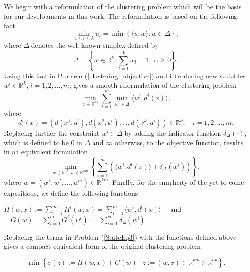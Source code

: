 We begin with a reformulation of the clustering problem which will be the basis for our developments in this work. The reformulation is based on the following fact:
\begin{equation*}
	\min\limits_{1 \leq l \leq k} u_l = \min \left\lbrace \langle u,w \rangle : w \in \Delta \right\rbrace ,
\end{equation*}
where $\Delta$ denotes the well-known simplex defined by
\begin{equation*}
	\Delta = \left\lbrace w \in \mathbb{R}^k : \sum\limits_{l=1}^{k} w_l = 1, \: w \geq 0 \right\rbrace .
\end{equation*}
Using this fact in Problem (\ref{clustering_objective}) and introducing new variables $w^i \in \mathbb{R}^k$, $i=1,2, \ldots, m$, gives a smooth reformulation of the clustering problem
\begin{equation}
	\min\limits_{x \in \mathbb{R}^{nk}} \sum\limits_{i=1}^{m} \min\limits_{w^i \in \Delta} \langle w^i , d^i(x) \rangle , \label{StateEq2}
\end{equation}
where 
\begin{equation}
d^{i}(x) = (d(x^1,a^i), d(x^2,a^i), \ldots , d(x^k,a^i)) \in \mathbb{R}^k, \quad i=1, 2, \ldots , m. \label{d^i_def}
\end{equation}
Replacing further the constraint $w^i \in \Delta$ by adding the indicator function $\delta_{\Delta}(\cdot)$, which is defined to be $0$ in $\Delta$ and $\infty$ otherwise, to the objective function, results in an equivalent formulation
\begin{equation}
	\min\limits_{x \in \mathbb{R}^{nk} , w \in \mathbb{R}^{km}} \left\lbrace \sum\limits_{i=1}^{m} \left( \langle w^i , d^i(x) \rangle + \delta_{\Delta}(w^i) \right) \right\rbrace , \label{StateEq3}
\end{equation}
where $w = (w^1, w^2, \ldots , w^m) \in \mathbb{R}^{km}$.
Finally, for the simplicity of the yet to come expositions, we define the following functions
\begin{center}
$H(w,x) := \sum\limits_{i=1}^{m} H^i(w,x) = \sum\limits_{i=1}^{m} \langle w^i , d^i(x) \rangle \quad$ and $\quad G(w) = \sum\limits_{i=1}^{m} G^i(w^i) := \sum\limits_{i=1}^{m} \delta_{\Delta}(w^i) .$
\end{center}

Replacing the terms in Problem (\ref{StateEq3}) with the functions defined above gives a compact equivalent form of the original clustering problem

\begin{equation}
	\min \left\lbrace \sigma(z) := H(w,x) + G(w) \mid z := (w,x) \in \mathbb{R}^{km} \times \mathbb{R}^{nk} \right\rbrace . \label{StateEq4}
\end{equation}

